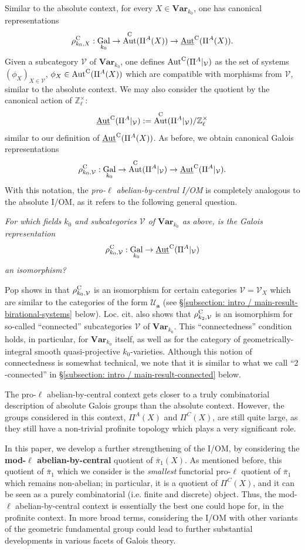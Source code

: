 \documentclass[11pt]{amsart}
\theoremstyle{definition}
\theoremstyle{remark}
\numberwithin{equation}{section}
\DeclareMathOperator{\Aut}{Aut}
\DeclareMathOperator{\Gal}{Gal}
\newcommand{\Z}{\mathbb{Z}}
\newcommand{\Vc}{\mathcal{V}}
\newcommand{\Ucal}{\mathcal{U}}
\newcommand{\abf}{\mathbf{a}}
\newcommand{\UAut}{\underline{\Aut}}
\newcommand{\Var}{\mathbf{Var}}
\newcommand{\Galk}{{\Gal_{k_0}}}
\begin{document}
Similar to the absolute context, for every $X \in \Var_{k_0}$, one has canonical representations
\[ \rho^{\rm C}_{k_0,X} : \Galk \rightarrow \Aut^{\rm C}(\Pi^A(X)) \rightarrow \UAut^{\rm C}(\Pi^A(X)). \]
Given a subcategory $\Vc$ of $\Var_{k_0}$, one defines $\Aut^{\rm C}(\Pi^A|_\Vc)$ as the set of systems $(\phi_X)_{X \in \Vc}$, $\phi_X \in \Aut^{\rm C}(\Pi^A(X))$ which are compatible with morphisms from $\Vc$, similar to the absolute context.
We may also consider the quotient by the canonical action of $\Z_\ell^\times$:
\[ \UAut^{\rm C}(\Pi^A|_\Vc) := \Aut^{\rm C}(\Pi^A|_\Vc)/\Z_\ell^\times \]
similar to our definition of $\UAut^{\rm C}(\Pi^A(X))$.
As before, we obtain canonical Galois representations
\[ \rho^{\rm C}_{k_0,\Vc} : \Galk \rightarrow \Aut^{\rm C}(\Pi^A|_\Vc) \rightarrow \UAut^{\rm C}(\Pi^A|_\Vc). \]
With this notation, the \emph{pro-$\ell$ abelian-by-central I/OM} is completely analogous to the absolute I/OM, as it refers to the following general question.

\vskip 5pt
{\em For which fields $k_0$ and subcategories $\Vc$ of $\Var_{k_0}$ as above, is the Galois representation 
\[ \rho^{\rm C}_{k_0,\Vc} : \Galk \rightarrow \UAut^{\rm C}(\Pi^A|_\Vc) \]
an isomorphism?}
\vskip 5pt

{\sc Pop} shows in \cite{Pop:2014} that $\rho^{\rm C}_{k_0,\Vc}$ is an isomorphism for certain categories $\Vc = \Vc_X$ which are similar to the categories of the form $\Ucal_\abf$ (see \S\ref{subsection: intro / main-result-birational-systems} below).
Loc. cit. also shows that $\rho^{\rm C}_{k_2,\Vc}$ is an isomorphism for so-called ``connected'' subcategories $\Vc$ of $\Var_{k_0}$.
This ``connectedness'' condition holds, in particular, for $\Var_{k_0}$ itself, as well as for the category of geometrically-integral smooth quasi-projective $k_0$-varieties.
Although this notion of connectedness is somewhat technical, we note that it is similar to what we call ``$2$-connected'' in \S\ref{subsection: intro / main-result-connected} below.

The pro-$\ell$ abelian-by-central context gets closer to a truly combinatorial description of absolute Galois groups than the absolute context.
However, the groups considered in this context, $\Pi^A(X)$ and $\Pi^C(X)$, are still quite large, as they still have a non-trivial profinite topology which plays a very significant role.

In this paper, we develop a further strengthening of the I/OM, by considering the {\bf mod-$\ell$ abelian-by-central} quotient of $\bar\pi_1(X)$.
As mentioned before, this quotient of $\bar\pi_1$ which we consider is the \emph{smallest} functorial pro-$\ell$ quotient of $\bar\pi_1$ which remains non-abelian; in particular, it is a quotient of $\Pi^C(X)$, and it can be seen as a purely combinatorial (i.e. finite and discrete) object.
Thus, the mod-$\ell$ abelian-by-central context is essentially the best one could hope for, in the profinite context.
In more broad terms, considering the I/OM with other variants of the geometric fundamental group could lead to further substantial developments in various facets of Galois theory.
\end{document}
